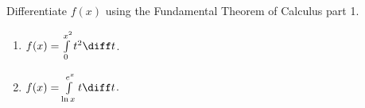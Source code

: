 Differentiate $f(x)$ using the Fundamental Theorem of Calculus part 1.
\begin{enumerate}
\item $f(x)=\int\limits_{0}^{x^2} t^2\diff t $.

\item $f(x)=\int\limits_{\ln x}^{e^x} t\diff t $.



\end{enumerate}